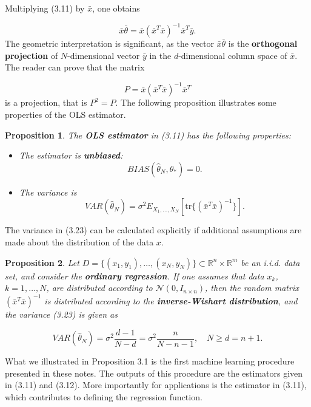 \documentclass{report}
\newtheorem{proposition}{Proposition}[chapter]
\begin{document}
Multiplying (3.11) by $\bar{x}$, one obtains

\begin{equation}
\bar{x}\bar{\theta} = \bar{x}(\bar{x}^T\bar{x})^{-1}\bar{x}^T\bar{y}.
\end{equation}
The geometric interpretation is significant, as the vector $\bar{x}\bar{\theta}$ is the \textbf{orthogonal projection} of $N$-dimensional vector $\bar{y}$ in the $d$-dimensional column space of $\bar{x}$. The reader can prove that the matrix

\begin{equation}
P = \bar{x}(\bar{x}^T\bar{x})^{-1}\bar{x}^T
\end{equation}
is a projection, that is $P^2 = P$. The following proposition illustrates some properties of the OLS estimator.

\begin{proposition}
The \textbf{OLS estimator} in (3.11) has the following properties:

\begin{itemize}
\item The estimator is \textbf{unbiased}:
\begin{equation}
BIAS(\hat{\theta}_N,\theta_*) = 0.
\end{equation}
\item The variance is
\begin{equation}
VAR(\hat{\theta}_N) = \sigma^2 E_{X_1,\dots,X_N}[\mathrm{tr}\{(\bar{x}^T\bar{x})^{-1}\}].
\end{equation}
\end{itemize}
\end{proposition}
The variance in (3.23) can be calculated explicitly if additional assumptions are made about the distribution of the data $x$.

\begin{proposition}
Let $D = \{(x_1,y_1),\dots,(x_N,y_N)\} \subset \mathbb{R}^n \times \mathbb{R}^m$ be an i.i.d. data set, and consider the \textbf{ordinary regression}. If one assumes that data $x_k$, $k = 1, \dots, N$, are distributed according to $\mathcal{N}(0, I_{n\times n})$, then the random matrix $(\bar{x}^T\bar{x})^{-1}$ is distributed according to the \textbf{inverse-Wishart distribution}, and the variance (3.23) is given as

\begin{equation}
VAR(\hat{\theta}_N) = \sigma^2\frac{d - 1}{N - d} = \sigma^2\frac{n}{N - n - 1}, \quad  N \geq d = n + 1.
\end{equation}
\end{proposition}
What we illustrated in Proposition 3.1 is the first machine learning procedure presented in these notes. The outputs of this procedure are the estimators given in (3.11) and (3.12). More importantly for applications is the estimator in (3.11), which contributes to defining the regression function.
\end{document}
